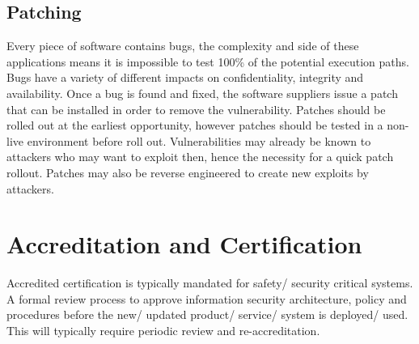 \subsection*{Patching}
Every piece of software contains bugs, the complexity and side of these applications means it is impossible to test 100\% of the potential execution paths. Bugs have a variety of different impacts on confidentiality, integrity and availability. Once a bug is found and fixed, the software suppliers issue a patch that can be installed in order to remove the vulnerability. Patches should be rolled out at the earliest opportunity, however patches should be tested in a non-live environment before roll out. Vulnerabilities may already be known to attackers who may want to exploit then, hence the necessity for a quick patch rollout. Patches may also be reverse engineered to create new exploits by attackers.

\section*{Accreditation and Certification}
Accredited certification is typically mandated for safety/ security critical systems. A formal review process to approve information security architecture, policy and procedures before the new/ updated product/ service/ system is deployed/ used. This will typically require periodic review and re-accreditation.